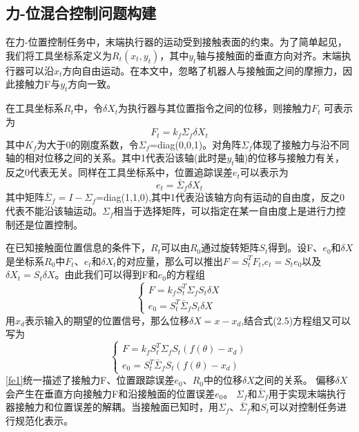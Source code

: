 \documentclass[12pt,a4paper,openany,oneside]{book}%
\numberwithin{equation}{chapter}%
\numberwithin{figure}{chapter}%
\begin{document}
\subsection{力-位混合控制问题构建}
在力-位置控制任务中，末端执行器的运动受到接触表面的约束。为了简单起见，我们将工具坐标系定义为$R_t(x_t,y_t)$，其中$y_t$轴与接触面的垂直方向对齐。末端执行器可以沿$x_t$方向自由运动。在本文中，忽略了机器人与接触面之间的摩擦力，因此接触力F与$y_t$方向一致。\par
在工具坐标系$R_t$中，令$\delta X_t$为执行器与其位置指令之间的位移，则接触力$F_t$ 可表示为
\begin{equation}\label{ft}
  F_t=k_f\Sigma_f\delta X_t
\end{equation}
其中$K_f$为大于0的刚度系数，令$\Sigma_f$=diag(0,0,1)。对角阵$\Sigma_f$体现了接触力与沿不同轴的相对位移之间的关系。其中1代表沿该轴(此时是$y_t$轴)的位移与接触力有关，反之0代表无关。同样在工具坐标系中，位置追踪误差$e_t$可以表示为
\begin{equation}\label{et}
  e_t=\bar{\Sigma}_f\delta X_t
\end{equation}
其中矩阵$\bar{\Sigma}_f=I-\Sigma_f$=diag(1,1,0),其中1代表沿该轴方向有运动的自由度，反之0代表不能沿该轴运动。$\Sigma_f$相当于选择矩阵，可以指定在某一自由度上是进行力控制还是位置控制。\par
在已知接触面位置信息的条件下，$R_t$可以由$R_0$通过旋转矩阵$S_t$得到。设F、$e_0$和$\delta X$是坐标系$R_0$中$F_t$、$e_t$和$\delta X_t$的对应量，那么可以推出$F=S^T_tF_t$,$e_t=S_te_0$以及$\delta X_t=S_t\delta X$。由此我们可以得到F和$e_0$的方程组
\begin{equation}\label{fe0}
  \begin{cases}
    F=k_fS^T_t\Sigma_fS_t\delta X \\
    e_0=S^T_t\bar{\Sigma}_fS_t\delta X
  \end{cases}
\end{equation}
用$x_d$表示输入的期望的位置信号，那么位移$\delta X=x-x_d$,结合式(2.5)方程组又可以写为
\begin{equation}\label{fe1}
  \begin{cases}
    F=k_fS^T_t\Sigma_fS_t(f(\theta)-x_d) \\
    e_0=S^T_t\bar{\Sigma}_fS_t(f(\theta)-x_d)
  \end{cases}
\end{equation}
\ref{fe1}统一描述了接触力F、位置跟踪误差$e_0$、$R_0$中的位移$\delta X$之间的关系。 偏移$\delta X$会产生在垂直方向接触力F和沿接触面的位置误差$e_0$。 $\Sigma_f$和$\bar{\Sigma}_f$用于实现末端执行器接触力和位置误差的解耦。当接触面已知时，用$\Sigma_f$、$\bar{\Sigma}_f$和$S_t$可以对控制任务进行规范化表示。\par
\end{document}
